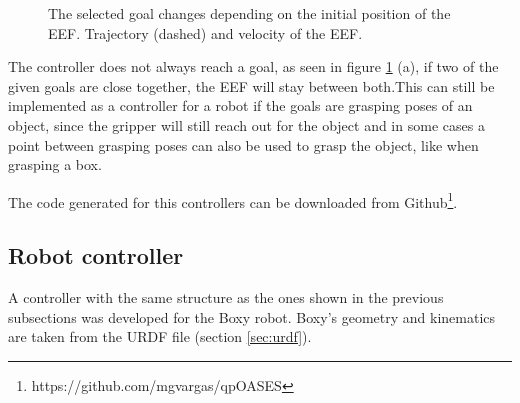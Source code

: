 \begin{figure}[H]
	\centering
	\begin{subfigure}[EEF closer to goal 2 (dotted)]
		{\texttt{[image: controllers/dyn\_3\_eef\_1.png]}}
	\end{subfigure}
	\begin{subfigure}[EEF closer to goal 1 (thin dotted)]
		{\texttt{[image: controllers/dyn\_3\_eef\_2.png]}}
	\end{subfigure}
	\vspace{-2pt}
	\caption[Dynamic weights: EEF]{The selected goal changes depending on the initial position of the EEF. Trajectory (dashed) and velocity of the EEF.}
	\vspace{-15pt}
	\label{fig:dynamic3}
\end{figure}
The controller does not always reach a goal, as seen in figure \ref{fig:dynamic3} (a), if two of the given goals are close together, the EEF will stay between both.This can still be implemented as a controller for a robot if the goals are grasping poses of an object, since the gripper will still reach out for the object and in some cases a point between grasping poses can also be used to grasp the object, like when grasping a box.

The code generated for this controllers can be downloaded from Github\footnote{https://github.com/mgvargas/qpOASES}.

\subsection{Robot controller}

A controller with the same structure as the ones shown in the previous subsections was developed for the Boxy robot. Boxy's geometry and kinematics are taken from the URDF file (section \ref{sec:urdf}). 

